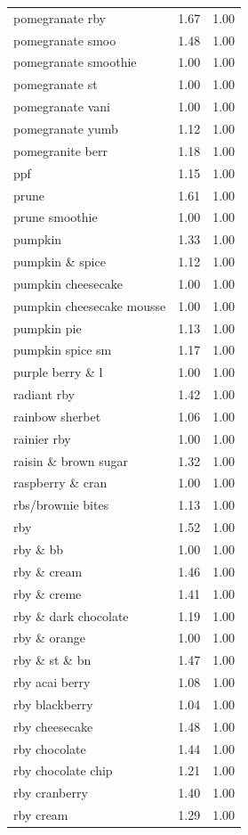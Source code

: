 \begin{table}
\begin{tabular}{lrr}
pomegranate rby & 1.67 & 1.00 \\
pomegranate smoo & 1.48 & 1.00 \\
pomegranate smoothie & 1.00 & 1.00 \\
pomegranate st & 1.00 & 1.00 \\
pomegranate vani & 1.00 & 1.00 \\
pomegranate yumb & 1.12 & 1.00 \\
pomegranite berr & 1.18 & 1.00 \\
ppf & 1.15 & 1.00 \\
prune & 1.61 & 1.00 \\
prune smoothie & 1.00 & 1.00 \\
pumpkin & 1.33 & 1.00 \\
pumpkin \& spice & 1.12 & 1.00 \\
pumpkin cheesecake & 1.00 & 1.00 \\
pumpkin cheesecake mousse & 1.00 & 1.00 \\
pumpkin pie & 1.13 & 1.00 \\
pumpkin spice sm & 1.17 & 1.00 \\
purple berry \& l & 1.00 & 1.00 \\
radiant rby & 1.42 & 1.00 \\
rainbow sherbet & 1.06 & 1.00 \\
rainier rby & 1.00 & 1.00 \\
raisin \& brown sugar & 1.32 & 1.00 \\
raspberry \& cran & 1.00 & 1.00 \\
rbs/brownie bites & 1.13 & 1.00 \\
rby & 1.52 & 1.00 \\
rby \& bb & 1.00 & 1.00 \\
rby \& cream & 1.46 & 1.00 \\
rby \& creme & 1.41 & 1.00 \\
rby \& dark chocolate & 1.19 & 1.00 \\
rby \& orange & 1.00 & 1.00 \\
rby \& st \& bn & 1.47 & 1.00 \\
rby acai berry & 1.08 & 1.00 \\
rby blackberry & 1.04 & 1.00 \\
rby cheesecake & 1.48 & 1.00 \\
rby chocolate & 1.44 & 1.00 \\
rby chocolate chip & 1.21 & 1.00 \\
rby cranberry & 1.40 & 1.00 \\
rby cream & 1.29 & 1.00 \\

\end{tabular}
\end{table}
